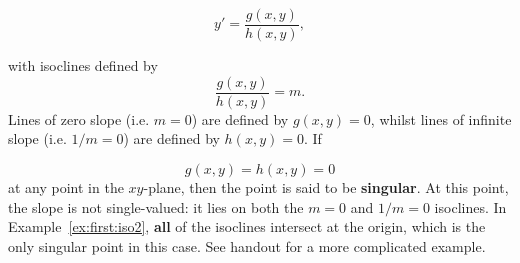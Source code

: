 \documentclass[a4paper]{report}
\begin{document}
\begin{displaymath}
y' =\frac{g(x,y)}{h(x,y)},
\end{displaymath}

\noindent with isoclines defined by 
\begin{displaymath}
\frac{g(x,y)}{h(x,y)} = m. 
\end{displaymath}
\noindent Lines of zero slope (i.e. $m=0$) are defined by $g(x,y)=0$, whilst lines of infinite slope (i.e. $1/m=0$) are defined by $h(x,y)=0$. If 

\begin{displaymath}
g(x,y)=h(x,y)=0
\end{displaymath}
\noindent at any point in the $xy$-plane, then the point is said to be {\bf singular}. At this point, the slope is not single-valued: it lies on both the $m=0$ and $1/m=0$ isoclines. In Example~\ref{ex:first:iso2}, {\bf all} of the isoclines intersect at the origin, which is the only singular point in this case. See handout for a more complicated example.
\end{document}
